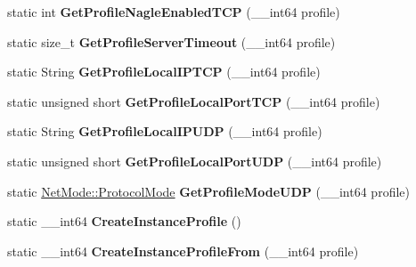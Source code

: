 \begin{DoxyCompactItemize}
\item 
\hypertarget{structmn_c_l_r_a1697295d83f1dbc01d1b1f87f93007cd}{
static int {\bfseries GetProfileNagleEnabledTCP} (\_\-\_\-int64 profile)}
\label{structmn_c_l_r_a1697295d83f1dbc01d1b1f87f93007cd}

\item 
\hypertarget{structmn_c_l_r_a030e40bc573bca822150cfbe13b7d987}{
static size\_\-t {\bfseries GetProfileServerTimeout} (\_\-\_\-int64 profile)}
\label{structmn_c_l_r_a030e40bc573bca822150cfbe13b7d987}

\item 
\hypertarget{structmn_c_l_r_a6c69aef00f63fd4797db6119f05724cc}{
static String {\bfseries GetProfileLocalIPTCP} (\_\-\_\-int64 profile)}
\label{structmn_c_l_r_a6c69aef00f63fd4797db6119f05724cc}

\item 
\hypertarget{structmn_c_l_r_a87caa7c1170f9aa993268763572af673}{
static unsigned short {\bfseries GetProfileLocalPortTCP} (\_\-\_\-int64 profile)}
\label{structmn_c_l_r_a87caa7c1170f9aa993268763572af673}

\item 
\hypertarget{structmn_c_l_r_a61254246e9fe1bb9041c0b8c9ac90d5e}{
static String {\bfseries GetProfileLocalIPUDP} (\_\-\_\-int64 profile)}
\label{structmn_c_l_r_a61254246e9fe1bb9041c0b8c9ac90d5e}

\item 
\hypertarget{structmn_c_l_r_a11e830ebd35dc1f330dd48caa251e3b9}{
static unsigned short {\bfseries GetProfileLocalPortUDP} (\_\-\_\-int64 profile)}
\label{structmn_c_l_r_a11e830ebd35dc1f330dd48caa251e3b9}

\item 
\hypertarget{structmn_c_l_r_a0dc4da94324e8ce758f5323b4cb4fd8d}{
static \hyperlink{class_net_mode_a43cfa55ee6a4db66a8d7d6c27f766964}{NetMode::ProtocolMode} {\bfseries GetProfileModeUDP} (\_\-\_\-int64 profile)}
\label{structmn_c_l_r_a0dc4da94324e8ce758f5323b4cb4fd8d}

\item 
\hypertarget{structmn_c_l_r_ab708a89c1946054920661484d6082366}{
static \_\-\_\-int64 {\bfseries CreateInstanceProfile} ()}
\label{structmn_c_l_r_ab708a89c1946054920661484d6082366}

\item 
\hypertarget{structmn_c_l_r_a65eed9047db491b7c2c3109b9a3e3981}{
static \_\-\_\-int64 {\bfseries CreateInstanceProfileFrom} (\_\-\_\-int64 profile)}
\label{structmn_c_l_r_a65eed9047db491b7c2c3109b9a3e3981}


\end{DoxyCompactItemize}
